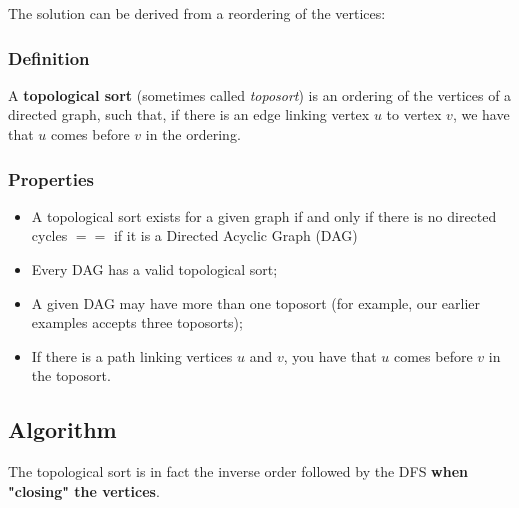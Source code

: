The solution can be derived from a reordering of the vertices:
\begin{center}
\end{center}
\subsubsection{Definition}
A \textbf{topological sort} (sometimes called \textit{toposort}) is an ordering of the vertices of a directed graph, such that, if there is an edge linking vertex $u$ to vertex $v$, we have that $u$ comes before $v$ in the ordering.

\subsubsection{Properties}
\begin{itemize}
\item A topological sort exists for a given graph if and only if there is no directed cycles $==$ if it is a Directed Acyclic Graph (DAG)
\item Every DAG has a valid topological sort;
\item A given DAG may have more than one toposort (for example, our earlier examples accepts three toposorts);
\item If there is a path linking vertices $u$ and $v$, you have that $u$ comes before $v$ in the toposort.
\end{itemize}


\subsection{Algorithm}
The topological sort is in fact the inverse order followed by the DFS \textbf{when "closing" the vertices}.

